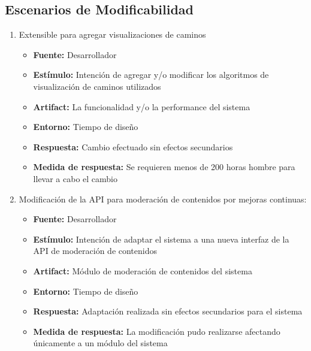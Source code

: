 \subsection{Escenarios de Modificabilidad}
\begin{enumerate}
  \item Extensible para agregar visualizaciones de  caminos
  \begin{itemize}
    \item \textbf{Fuente:} Desarrollador
    \item \textbf{Estímulo:} Intención de agregar y/o modificar los algoritmos de visualización de caminos utilizados
    \item \textbf{Artifact:} La funcionalidad y/o la performance del sistema
    \item \textbf{Entorno:} Tiempo de diseño
    \item \textbf{Respuesta:} Cambio efectuado sin efectos secundarios
    \item \textbf{Medida de respuesta:} Se requieren menos de 200 horas hombre para llevar a cabo el cambio 
  \end{itemize}

  \item Modificación de la API para moderación de contenidos por mejoras continuas:
  \begin{itemize}
    \item \textbf{Fuente:} Desarrollador
    \item \textbf{Estímulo:} Intención de adaptar el sistema a una nueva interfaz de la API de moderación de contenidos
    \item \textbf{Artifact:} Módulo de moderación de contenidos del sistema
    \item \textbf{Entorno:} Tiempo de diseño
    \item \textbf{Respuesta:} Adaptación realizada sin efectos secundarios para el sistema
    \item \textbf{Medida de respuesta:} La modificación pudo realizarse afectando únicamente a un módulo del sistema
  \end{itemize}
\end{enumerate}

